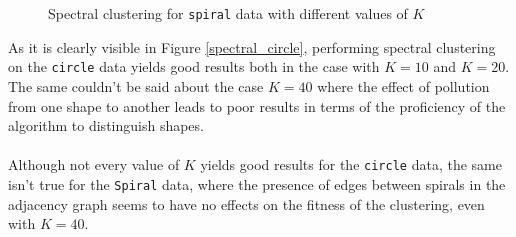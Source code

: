 \begin{figure}[H]
    \caption{Spectral clustering for \texttt{spiral} data with different values of \(K\)}
    \label{spectral_spiral}
  \end{figure}
  \noindent As it is clearly visible in Figure \ref{spectral_circle}, performing spectral clustering on the \texttt{circle} data yields good results both in the case with \(K=10\) and \(K=20\). The same couldn't be said about the case \(K=40\) where the effect of pollution from one shape to another leads to poor results in terms of the proficiency of the algorithm to distinguish shapes.
  \\
  \\
  Although not every value of \(K\) yields good results for the \texttt{circle} data, the same isn't true for the \texttt{Spiral} data, where the presence of edges between spirals in the adjacency graph seems to have no effects on the fitness of the clustering, even with \(K=40\).